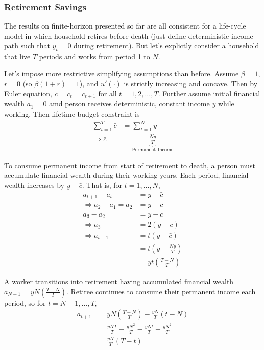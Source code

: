 \documentclass[11pt]{article}
\begin{document}
\subsubsection{Retirement Savings}
The results on finite-horizon presented so far are all consistent for a life-cycle model in which household retires before death (just define deterministic income path such that $y_t = 0$ during retirement). But let's explictly consider a household that live $T$ periods and works from period 1 to $N$.

Let's impose more restrictive simplifying assumptions than before. Assume $\beta = 1$, $r=0$ (so $\beta(1+r) = 1$), and $u'(\cdot)$ is strictly increasing and concave. Then by Euler equation, $\bar{c} = c_t = c_{t+1}$ for all $t=1,2,\dots,T$. Further assume initial financial wealth $a_1 = 0$ amd person receives deterministic, constant income $y$ while working. Then lifetime budget constraint is 
\begin{align*}
    \sum_{t=1}^T \bar{c} &= \sum_{t=1}^N y \\
    \Rightarrow \bar{c} &= \underbrace{\frac{Ny}{T}}_{\text{Permanent Income}} 
\end{align*} 

To consume permanent income from start of retirement to death, a person must accumulate financial wealth during their working years. Each period, financial wealth increases by $y - \bar{c}$. That is, for $t=1,\dots,N$,
\begin{align*}
    a_{t+1} - a_t &= y - \bar{c} \\
    \Rightarrow a_2 - a_1 = a_2 &= y - \bar{c} \\
                a_3 - a_2 &= y - \bar{c} \\
    \Rightarrow a_3 &= 2(y-\bar{c}) \\
    \Rightarrow a_{t+1} &= t(y-\bar{c}) \\
    &= t\left(y - \frac{Ny}{T}\right) \\
    &= yt\left(\frac{T-N}{T}\right)
\end{align*}

A worker transitions into retirement having accumulated financial wealth $a_{N+1} = yN\left(\frac{T-N}{T}\right)$. Retiree continues to consume their permanent income each period, so for $t=N+1,\dots,T$,
\begin{align*}
    a_{t+1} &= yN\left(\frac{T-N}{T}\right) - \frac{yN}{T}(t-N) \\
    &= \frac{yNT}{T} - \frac{yN^2}{T} - \frac{yNt}{T} + \frac{yN^2}{T} \\
    &= \frac{yN}{T}(T-t)
\end{align*}
\end{document}
